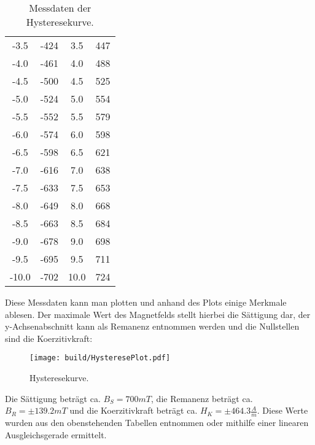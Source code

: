 \begin{table}[H]
\begin{tabular}{c c c c}
            -3.5  &  -424  &   3.5   & 447  \\
            -4.0  &  -461  &   4.0   & 488  \\
            -4.5  &  -500  &   4.5   & 525  \\
            -5.0  &  -524  &   5.0   & 554  \\
            -5.5  &  -552  &   5.5   & 579  \\
            -6.0  &  -574  &   6.0   & 598  \\
            -6.5  &  -598  &   6.5   & 621  \\
            -7.0  &  -616  &   7.0   & 638  \\
            -7.5  &  -633  &   7.5   & 653  \\
            -8.0  &  -649  &   8.0   & 668  \\
            -8.5  &  -663  &   8.5   & 684  \\
            -9.0  &  -678  &   9.0   & 698  \\
            -9.5  &  -695  &   9.5   & 711  \\
            -10.0 &  -702  &  10.0   & 724  \\
            \bottomrule
        \end{tabular}
        \caption{Messdaten der Hysteresekurve.}
        \label{tab:Hysteresekurve}
    \end{table}
    Diese Messdaten kann man plotten und anhand des Plots einige Merkmale ablesen.
    Der maximale Wert des Magnetfelds stellt hierbei die Sättigung dar, der y-Achsenabschnitt kann als Remanenz entnommen werden und die Nullstellen sind die Koerzitivkraft: 
    \begin{figure}[H]
        \centering
        \texttt{[image: build/HysteresePlot.pdf]}
        \caption{Hysteresekurve.}
        \label{fig:HystereseKurve}
    \end{figure}
    Die Sättigung beträgt ca. $B_S=700\unit{mT}$, die Remanenz beträgt ca. $B_R=\pm139.2\unit{mT}$ und die Koerzitivkraft beträgt ca. $H_K=\pm464.3\unit{\frac{A}{m}}$.
    Diese Werte wurden aus den obenstehenden Tabellen entnommen oder mithilfe einer linearen Ausgleichsgerade ermittelt.
    \label{sec:AuswHyst}
